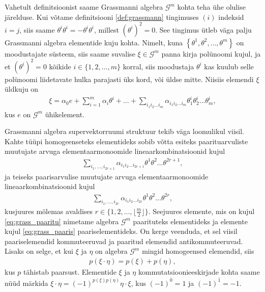 \documentclass[12pt,a4paper,oneside]{article}
\theoremstyle{plain}
\theoremstyle{definition}
\numberwithin{equation}{section}
\def\G{{\mathcal G}}
\begin{document}
Vahetult definitsioonist saame Grassmanni algebra $\G^m$ kohta 
teha ühe olulise järelduse. Kui võtame definitsiooni 
\ref{def:grassmann} tingimuses $(i)$ indeksid $i = j$, siis saame 
$\theta^i \theta^i = -\theta^i \theta^i$, millest
$\left(\theta^i\right)^2 = 0$. See tingimus ütleb väga palju 
Grassmanni algebra elementide kuju kohta. Nimelt, kuna 
$\left\lbrace\theta^1, \theta^2, \ldots, \theta^m\right\rbrace$ 
on moodustajate süsteem, siis saame suvalise $\xi \in \G^m$ 
panna kirja polünoomi kujul, ja et $\left(\theta^i\right)^2 = 0$ 
kõikide $i \in \{1, 2, \ldots, m\}$ korral, siis moodustaja 
$\theta^i$ kas kuulub selle polünoomi liidetavate hulka parajasti 
üks kord, või üldse mitte. Niisiis elemendi $\xi$ üldkuju on
\begin{align*}
\xi = \alpha_0 e + \sum_{i = 1}^{m} \alpha_i \theta^i + \ldots + 
\sum_{i_1 i_2 \ldots i_m} \alpha_{i_1 i_2 \ldots i_m} 
\theta^i_1 \theta^i_2 \ldots \theta^i_m,
\end{align*}
kus $e$ on $\G^m$ ühikelement.

Grassmanni algebra supervektorruumi struktuur tekib väga loomulikul 
viisil. Kahte tüüpi homogeenseteks elementideks sobib võtta
esiteks paarituarvuliste muutujate arvuga elementaarmonoomide 
lineaarkombinatsioonid kujul
\begin{align} \label{eq:grass_paaritu}
\sum_{i_1, \ldots, i_{2r+1}} \alpha_{i_1 i_2 \ldots i_{2r+1}} 
\theta^1 \theta^2 \ldots \theta^{2r+1},
\end{align}
ja teiseks paarisarvulise muutujate arvuga elementaarmonoomide 
lineaarkombinatsioonid kujul
\begin{align} \label{eq:grass_paaris}
\sum_{i_1, \ldots, i_{2r}} \alpha_{i_1 i_2 \ldots i_{2r}} 
\theta^1 \theta^2 \ldots \theta^{2r},
\end{align}
kusjuures mõlemas avaldises $r \in \{1, 2, \ldots, 
\lfloor \frac{m}{2} \rfloor \}$. Seejuures elemente, mis on kujul 
\ref{eq:grass_paaritu} nimetame algebra $\G^m$ paarituteks 
elementideks ja elemente kujul \ref{eq:grass_paaris} 
paaris\-elementideks. On kerge veenduda, et sel viisil 
paariselemendid kommuteeruvad ja paaritud elemendid 
antikommuteeruvad. Lisaks on selge, et kui $\xi$ ja $\eta$ on 
algebra $\G^m$ mingid homogeensed elemendid, siis 
\begin{align} \label{eq:grass_parity}
p \left(\xi \cdot \eta \right) = p \left(\xi\right) 
+ p \left(\eta \right),
\end{align}
kus $p$ tähistab paarsust. Elementide $\xi$ ja $\eta$ 
kommutatsioonieeskirjade kohta saame nüüd 
märkida $\xi \cdot \eta = \left(-1\right)^{p\left(\xi\right) 
p\left(\eta\right)} \eta \cdot \xi$, kus 
$\left(-1\right)^{\overline{0}} = 1$ ja 
$\left(-1\right)^{\overline{1}} = -1$.
\end{document}
